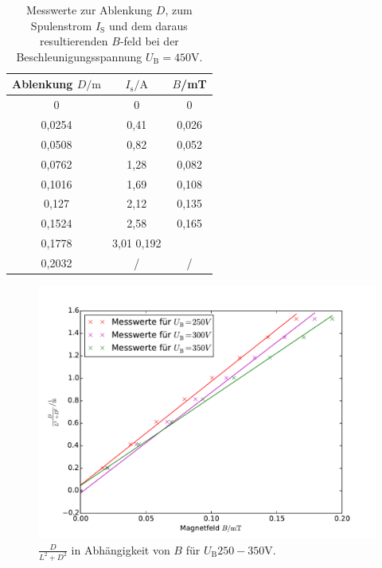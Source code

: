 \begin{table}
  \caption{Messwerte zur Ablenkung $D$, zum Spulenstrom $I_\mathrm{S}$ und dem daraus resultierenden $B$-feld bei der Beschleunigungsspannung $U_\mathrm{B}=450 \si{\volt}$.}
  \centering
  \label{tab:messwerte-e}
  \begin{tabular}{c c c}
    \toprule
      Ablenkung $D/\si{\meter}$ & $I_\mathrm{s}/\si{\ampere}$ & $B$/\si{\milli\tesla}\\
    \midrule
0  & 0 & 0 \\
0,0254 & 0,41 & 0,026 \\
0,0508 & 0,82 & 0,052\\
0,0762 & 1,28 & 0,082\\
0,1016 & 1,69 & 0,108 \\
0,127 & 2,12 & 0,135\\
0,1524 & 2,58 & 0,165\\
0,1778 & 3,01  0,192\\
0,2032 & / & / \\
\bottomrule
\end{tabular}
\end{table}

\begin{figure}
  \centering
  \includegraphics[scale=0.8]{auswertung/502-a.pdf}
\caption{$\frac{D}{L^2+D^2}$ in Abhängigkeit von $B$ für $U_\mathrm{B} 250 - 350 \si{\volt}$.}
  \label{fig:spez.ladung1}
\end{figure}

